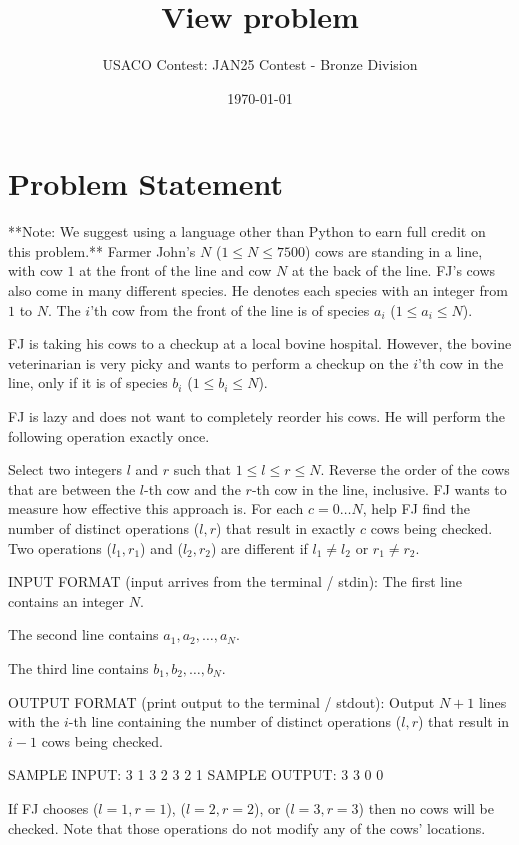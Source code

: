 \documentclass[12pt]{article}
\title{View problem}
\author{USACO Contest: JAN25 Contest - Bronze Division}
\date{\today}
\begin{document}
\maketitle

\section*{Problem Statement}


**Note: We suggest using a language other than Python to earn full credit on this problem.**
Farmer John's $N$ ($1 \leq N \leq 7500$) cows are standing in a line, with cow
$1$ at the front of the line and cow $N$ at the back of the line. FJ's cows also
come in many different species. He denotes each species with an integer from $1$
to $N$. The $i$'th cow from the front of the line is of species $a_i$
($1 \leq a_i \leq N$). 

FJ is taking his cows to a checkup at a local bovine hospital. However, the
bovine veterinarian is very picky and wants to perform a checkup on the $i$'th
cow in the line, only if it is of species $b_i$ ($1 \leq b_i \leq N$). 

FJ is lazy and does not want to completely reorder his cows.  He will perform
the following operation exactly once.

 Select two integers $l$ and $r$ such that $1 \leq l \le r \leq N$. Reverse
the order of the cows that are between the $l$-th cow and the $r$-th cow in the
line, inclusive. 
FJ wants to measure how effective this approach is. For each $c=0 \ldots N$,
help FJ find the number of distinct operations ($l,r$) that result in exactly
$c$ cows being checked. Two operations ($l_1,r_1$) and ($l_2,r_2$) are different
if $l_1 \neq l_2$ or $r_1 \neq r_2$.

INPUT FORMAT (input arrives from the terminal / stdin):
The first line contains an integer $N$.

The second line contains $a_1, a_2, \ldots, a_N$.

The third line contains $b_1, b_2, \ldots, b_N$.

OUTPUT FORMAT (print output to the terminal / stdout):
Output $N+1$ lines with the $i$-th line containing the number of distinct
operations ($l,r$) that result in $i-1$ cows being checked.

SAMPLE INPUT:
3
1 3 2
3 2 1
SAMPLE OUTPUT: 
3
3
0
0

If FJ chooses ($l=1,r=1$), ($l=2,r=2$), or ($l=3,r=3$) then no cows will be
checked. Note that those operations do not modify any of the cows' locations.
\end{document}
